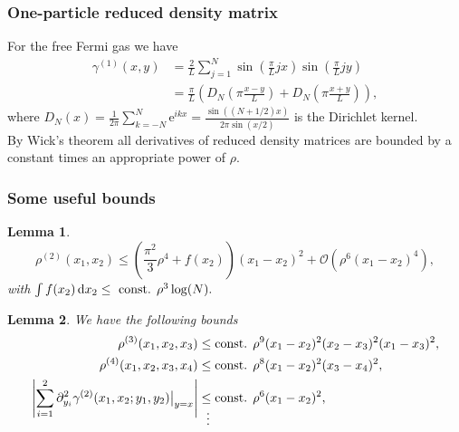\documentclass{beamer}[10]
\newcommand{\euler}[1]{\text{e}^{#1}}
\newcommand{\abs}[1]{\left\lvert #1 \right\rvert}
\newcommand*\diff{\mathop{}\!\mathrm{d}}
\newtheorem{mlemma}{Lemma}
\begin{document}
\begin{frame}
	\frametitle{One-particle reduced density matrix}
	\begin{block}{}
		For the free Fermi gas we have
	\begin{equation}
	\begin{aligned}
	\gamma^{(1)}(x,y)&=\frac{2}{L}\sum_{j=1}^{N}\sin\left(\frac{\pi}{L}jx\right)\sin\left(\frac{\pi}{L} jy\right)\\
	&=\frac{\pi}{L}\left(D_{N}\left(\pi\frac{x-y}{L}\right)+D_{N}\left(\pi\frac{x+y}{L}\right)\right),
	\end{aligned}
	\end{equation}
	where $ D_N(x)=\frac{1}{2\pi}\sum_{k=-N}^{N}\euler{ikx}=\frac{\sin((N+1/2)x)}{2\pi\sin(x/2)} $ is the Dirichlet kernel.\\
	By Wick's theorem all derivatives of reduced density matrices are bounded by a constant times an appropriate power of $ \rho $.
		\end{block}	
	\end{frame}


\begin{frame}
	\frametitle{Some useful bounds}
	\begin{block}{}
		\vspace{-0.5cm}
		\footnotesize{\begin{mlemma}\label{Lemma rho2 bound}
			$$ \rho^{(2)}(x_1,x_2)\leq\left(\frac{\pi^2}{3}\rho^4+f(x_2)\right)(x_1-x_2)^2+\mathcal{O}(\rho^6(x_1-x_2)^4), $$ 
			with $ \int f(x_2)\diff x_2\leq \textnormal{ const. }\rho^3\log(N). $
		\end{mlemma}
			\begin{mlemma}\label{LemmaDensityBounds}
				We have the following bounds\begin{equation*}
				\begin{aligned}
				\rho^{(3)}(x_1,x_2,x_3)&\leq \textnormal{const. }\rho^9(x_1-x_2)^2(x_2-x_3)^2(x_1-x_3)^2,\\
				\rho^{(4)}(x_1,x_2,x_3,x_4)&\leq \textnormal{const. }\rho^8(x_1-x_2)^2(x_3-x_4)^2,\\
				\abs{\sum_{i=1}^{2}\partial_{y_i}^2\gamma^{(2)}(x_1,x_2;y_1,y_2)\big\rvert_{y=x}}&\leq \textnormal{const. } \rho^{6}(x_1-x_2)^2,\\[-3.2ex]
				&\ \ \vdots
				\end{aligned}
				\end{equation*}
			\end{mlemma}	}
	\end{block}	
\end{frame}
\end{document}
